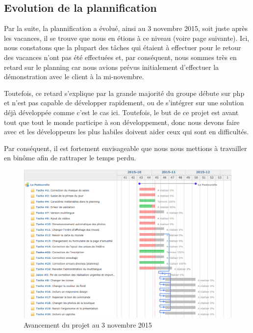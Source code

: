 \documentclass[11pt]{report}
\begin{document}
\subsection{Evolution de la plannification}
Par la suite, la plannification a évolué, ainsi au 3 novembre 2015, soit juste
après les vacances, il se trouve que nous en étions à ce niveau (voire page
suivante). Ici, nous constatons que la plupart des tâches qui étaient à
effectuer pour le retour des vacances n'ont pas été effectuées et, par
conséquent, nous sommes très en retard sur le planning car nous avions prévus
initialement d'effectuer la démonstration avec le client à la mi-novembre.
\par Toutefois, ce retard s'explique par la grande majorité du groupe débute sur
php et n'est pas capable de développer rapidement, ou de s'intégrer sur une
solution déjà développée comme c'est le cas ici. Toutefois, le but de ce projet
est avant tout que tout le monde participe à son développement, donc nous devons
faire avec et les développeurs les plus habiles doivent aider ceux qui sont en
difficultés. 
\par Par conséquent, il est fortement envisageable que nous nous mettions à
travailler en binôme afin de rattraper le temps perdu.

\begin{landscape}
\begin{figure}[t]
    \caption{Avancement du projet au 3 novembre 2015}
   \includegraphics[scale=0.5]{include/gantt3-11.png}
\end{figure}
\end{landscape}
\end{document}
